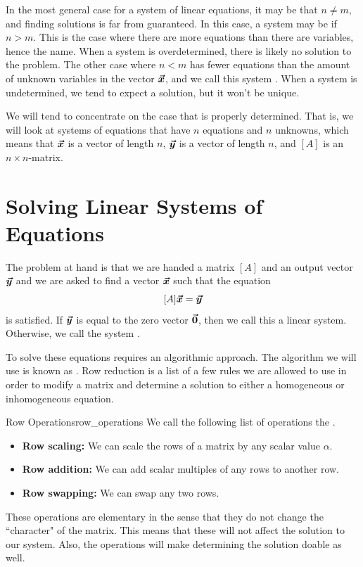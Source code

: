        In the most general case for a system of linear equations, it may be that $n\neq m$, and finding solutions is far from guaranteed.  In this case, a system may be  if $n>m$. This is the case where there are more equations than there are variables, hence the name.  When a system is overdetermined, there is likely no solution to the problem. The other case where $n<m$ has fewer equations than the amount of unknown variables in the vector $\boldsymbol{\boldsymbol{\vec{x}}}$, and we call this system . When a system is undetermined, we tend to expect a solution, but it won't be unique. 
        
        We will tend to concentrate on the case that is properly determined. That is, we will look at systems of equations that have $n$ equations and $n$ unknowns, which means that $\boldsymbol{\boldsymbol{\vec{x}}}$ is a vector of length $n$, $\boldsymbol{\boldsymbol{\vec{y}}}$ is a vector of length $n$, and $[A]$ is an $n\times n$-matrix.
        
        
        \section{Solving Linear Systems of Equations}
        The problem at hand is that we are handed a matrix $[A]$ and an output vector $\boldsymbol{\boldsymbol{\vec{y}}}$ and we are asked to find a vector $\boldsymbol{\boldsymbol{\vec{x}}}$ such that the equation
        \[
        [A]\boldsymbol{\boldsymbol{\vec{x}}}=\boldsymbol{\boldsymbol{\vec{y}}}
        \]
        is satisfied. If $\boldsymbol{\boldsymbol{\vec{y}}}$ is equal to the zero vector $\boldsymbol{\vec{0}}$, then we call this a  linear system. Otherwise, we call the system .
        
        To solve these equations requires an algorithmic approach. The algorithm we will use is known as . Row reduction is a list of a few rules we are allowed to use in order to modify a matrix and determine a solution to either a homogeneous or inhomogeneous equation.
        
        \begin{df}{Row Operations}{row_operations}
        We call the following list of operations the .
        \begin{itemize}
            \item \textbf{Row scaling:} We can scale the rows of a matrix by any scalar value $\alpha$.
            \item \textbf{Row addition:} We can add scalar multiples of any rows to another row.
            \item \textbf{Row swapping:} We can swap any two rows.
        \end{itemize}
        These operations are elementary in the sense that they do not change the ``character" of the matrix.  This means that these will not affect the solution to our system. Also, the operations will make determining the solution doable as well.
        \end{df}
        
